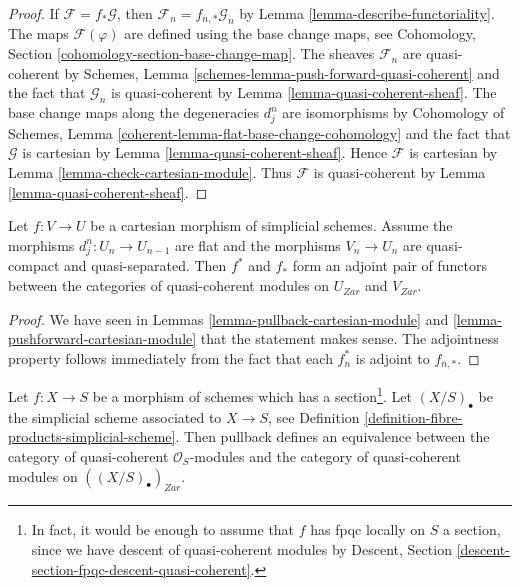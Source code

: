 \begin{proof}
If $\mathcal{F} = f_* \mathcal{G}$, then
$\mathcal{F}_n = f_{n , *}\mathcal{G}_n$ by
Lemma \ref{lemma-describe-functoriality}.
The maps $\mathcal{F}(\varphi)$ are defined using the base change maps, see
Cohomology, Section \ref{cohomology-section-base-change-map}.
The sheaves $\mathcal{F}_n$ are quasi-coherent by
Schemes, Lemma \ref{schemes-lemma-push-forward-quasi-coherent}
and the fact that $\mathcal{G}_n$ is quasi-coherent
by Lemma \ref{lemma-quasi-coherent-sheaf}.
The base change maps along the degeneracies
$d^n_j$ are isomorphisms by Cohomology of Schemes, Lemma
\ref{coherent-lemma-flat-base-change-cohomology}
and the fact that $\mathcal{G}$ is cartesian
by Lemma \ref{lemma-quasi-coherent-sheaf}.
Hence $\mathcal{F}$ is cartesian by
Lemma \ref{lemma-check-cartesian-module}.
Thus $\mathcal{F}$ is quasi-coherent by
Lemma \ref{lemma-quasi-coherent-sheaf}.
\end{proof}

\begin{lemma}
\label{lemma-adjoint-functors-cartesian-modules}
Let $f : V \to U$ be a cartesian morphism of
simplicial schemes. Assume the morphisms $d^n_j : U_n \to U_{n - 1}$ are
flat and the morphisms $V_n \to U_n$ are quasi-compact and quasi-separated.
Then $f^*$ and $f_*$ form an adjoint pair of functors
between the categories of quasi-coherent modules on $U_{Zar}$ and $V_{Zar}$.
\end{lemma}

\begin{proof}
We have seen in Lemmas \ref{lemma-pullback-cartesian-module} and
\ref{lemma-pushforward-cartesian-module}
that the statement makes sense. The adjointness property follows
immediately from the fact that each $f_n^*$ is adjoint to $f_{n, *}$.
\end{proof}

\begin{lemma}
\label{lemma-cartesian-modules-with-section}
Let $f : X \to S$ be a morphism of schemes which has a
section\footnote{In fact, it would be enough to assume that $f$
has fpqc locally on $S$ a section, since we have descent of
quasi-coherent modules by Descent,
Section \ref{descent-section-fpqc-descent-quasi-coherent}.}.
Let $(X/S)_\bullet$ be the simplicial
scheme associated to $X \to S$, see
Definition \ref{definition-fibre-products-simplicial-scheme}.
Then pullback defines an equivalence between the category of
quasi-coherent $\mathcal{O}_S$-modules and the category of
quasi-coherent modules on $((X/S)_\bullet)_{Zar}$.
\end{lemma}

